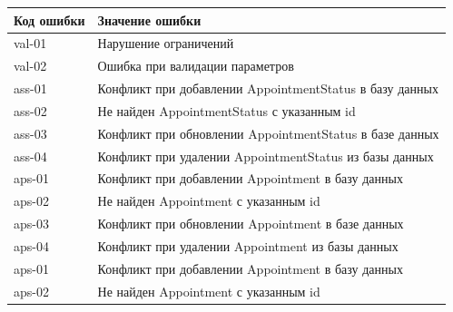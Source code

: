 \documentclass[a4paper,article]{article}
\begin{document}
\begin{sloppypar}
\begin{appendices}
        \begin{xltabular}{\textwidth} { |
                >{\hsize} X |
                >{\hsize} X | }
            
            \hline
            Код ошибки
            & Значение ошибки \\
            
            \hline
            val-01
            & Нарушение ограничений \\
            
            \hline
            val-02
            & Ошибка при валидации параметров \\
            
            \hline
            ass-01
            & Конфликт при добавлении AppointmentStatus в базу данных \\
            
            \hline
            ass-02
            & Не найден AppointmentStatus с указанным id \\
            
            \hline
            ass-03
            & Конфликт при обновлении AppointmentStatus в базе данных \\
            
            \hline
            ass-04
            & Конфликт при удалении AppointmentStatus из базы данных \\
            
            \hline
            aps-01
            & Конфликт при добавлении Appointment в базу данных \\
            
            \hline
            aps-02
            & Не найден Appointment с указанным id \\
            
            \hline
            aps-03
            & Конфликт при обновлении Appointment в базе данных \\
            
            \hline
            aps-04
            & Конфликт при удалении Appointment из базы данных \\
            
            \hline
            aps-01
            & Конфликт при добавлении Appointment в базу данных \\
            
            \hline
            aps-02
            & Не найден Appointment с указанным id \\
            

\end{xltabular}
\end{appendices}
\end{sloppypar}
\end{document}
